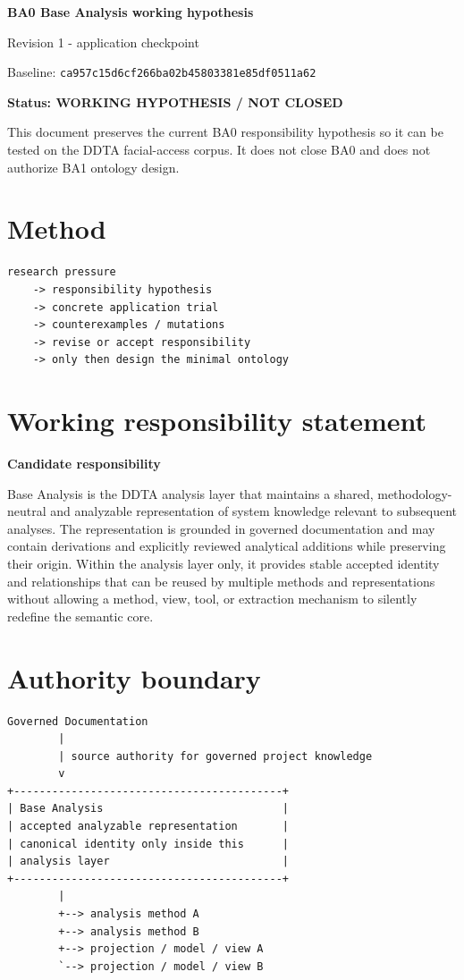 \documentclass[10pt,a4paper]{article}
\newenvironment{hypothesis}[1]{\def\FrameCommand{\fcolorbox{ddtaorange}{ddtagray}}\MakeFramed{\advance\hsize-2\width\FrameRestore}\noindent\textbf{#1}\par\smallskip}{\endMakeFramed}
\begin{document}
\begin{center}
{\LARGE\bfseries BA0 Base Analysis working hypothesis}\par
{\large Revision 1 - application checkpoint}\par\smallskip
{\small Baseline: \texttt{ca957c15d6cf266ba02b45803381e85df0511a62}}
\end{center}

\begin{hypothesis}{Status: WORKING HYPOTHESIS / NOT CLOSED}
This document preserves the current BA0 responsibility hypothesis so it can be tested on the DDTA facial-access corpus. It does not close BA0 and does not authorize BA1 ontology design.
\end{hypothesis}

\section{Method}
\begin{lstlisting}
research pressure
    -> responsibility hypothesis
    -> concrete application trial
    -> counterexamples / mutations
    -> revise or accept responsibility
    -> only then design the minimal ontology
\end{lstlisting}

\section{Working responsibility statement}
\begin{hypothesis}{Candidate responsibility}
Base Analysis is the DDTA analysis layer that maintains a shared, methodology-neutral and analyzable representation of system knowledge relevant to subsequent analyses. The representation is grounded in governed documentation and may contain derivations and explicitly reviewed analytical additions while preserving their origin. Within the analysis layer only, it provides stable accepted identity and relationships that can be reused by multiple methods and representations without allowing a method, view, tool, or extraction mechanism to silently redefine the semantic core.
\end{hypothesis}

\section{Authority boundary}
\begin{lstlisting}
Governed Documentation
        |
        | source authority for governed project knowledge
        v
+------------------------------------------+
| Base Analysis                            |
| accepted analyzable representation       |
| canonical identity only inside this      |
| analysis layer                           |
+------------------------------------------+
        |
        +--> analysis method A
        +--> analysis method B
        +--> projection / model / view A
        `--> projection / model / view B
\end{lstlisting}
\end{document}
